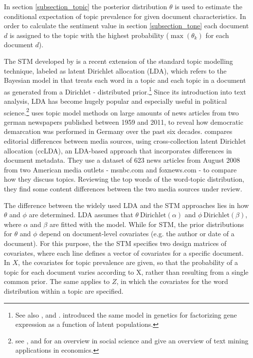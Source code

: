 \documentclass[12pt,a4paper,notitlepage]{article}
\begin{document}
In section \ref{subsection_topic} the posterior distribution $\theta$ is used to estimate the conditional expectation of topic prevalence for given document characteristics. In order to calculate the sentiment value in section \ref{subsection_tone} each document $d$ is assigned to the topic with the highest probability ($\max (\theta_{k})$ for each document $d$).

The STM developed by \citet{roberts_model_2016} is a recent extension of the standard topic modelling technique, labeled as latent Dirichlet allocation (LDA), which refers to the Bayesian model in \citet{blei_latent_2003} that treats each word in a topic and each topic in a document as generated from a Dirichlet - distributed prior.\footnote{See also \citet{griffiths_probabilistic_2002}, \citet{griffiths_finding_2004} and \citet{hofmann_probabilistic_1999}. \citet{pritchard_inference_2000} introduced the same model in genetics for factorizing gene expression as a function of latent populations.} Since its introduction into text analysis, LDA has become hugely popular and especially useful in political science.\footnote{see \citet{blei_probabilistic_2012}, \citet{grimmer_text_2013} and \citet{wiedmann_text_2016} for an overview in social science and \citet{gentzkow_text_2017} give an overview of text mining applications in economics.} \citet{wiedmann_text_2016} uses topic model methods on large amounts of news articles from two german newspapers published between 1959 and 2011, to reveal how democratic demarcation was performed in Germany over the past six decades. \citet{paul_cross-collection_2009} compares editorial differences between media sources, using cross-collection latent Dirichlet allocation (ccLDA), an LDA-based approach that incorporates differences in document metadata. They use a dataset of 623 news articles from August 2008 from two American media outlets - msnbc.com and foxnews.com - to compare how they discuss topics. Reviewing the top words of the word-topic distribution, they find some content differences between the two media sources under review. 

The difference between the widely used LDA and the STM approaches lies in how $\theta$ and $\phi$ are determined. LDA assumes that $\theta ~ \text{Dirichlet}(\alpha)$ and $\phi ~ \text{Dirichlet}(\beta)$, where $\alpha$ and $\beta$ are fitted with the model. While for STM, the prior distributions for $\theta$ and $\phi$ depend on document-level covariates (e.g. the author or date of a document). For this purpose, the the STM specifies two design matrices of covariates, where each line defines a vector of covariates for a specific document.  In $X$, the covariates for topic prevalence are given, so that the probability of a topic for each document varies according to X, rather than resulting from a single common prior. The same applies to $Z$, in which the covariates for the word distribution within a topic are specified. 
\end{document}
